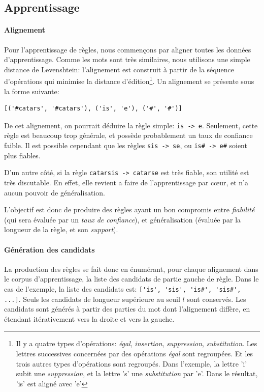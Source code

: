 \documentclass{article}
\begin{document}
\subsection{Apprentissage}
\paragraph{Alignement}
Pour l'apprentissage de règles, nous commençons par aligner toutes les données d'apprentissage. Comme les mots sont très similaires, nous utilisons une simple distance de Levenshtein: l'alignement est construit à partir de la séquence d'opérations qui minimise la distance d'édition\footnote{Il y a quatre types d'opérations: \emph{égal}, \emph{insertion}, \emph{suppression}, \emph{substitution}. Les lettres successives concernées par des opérations \emph{égal} sont regroupées. Et les trois autres types d'opérations sont regroupés. Dans l'exemple, la lettre 'i' subit une \emph{suppression}, et la lettre 's' une \emph{substitution} par 'e'. Dans le résultat, 'is' est aligné avec 'e'}.
Un alignement se présente sous la forme suivante:
\begin{verbatim}
[('#catars', '#catars'), ('is', 'e'), ('#', '#')]
\end{verbatim}

De cet alignement, on pourrait déduire la règle simple: \verb|is -> e|. Seulement, cette règle est beaucoup trop générale, et possède probablement un taux de confiance faible. Il est possible cependant que les règles \verb|sis -> se|, ou \verb|is# -> e#| soient plus fiables.

D'un autre côté, si la règle \verb|catarsis -> catarse| est très fiable, son utilité est très discutable. En effet, elle revient a faire de l'apprentissage par c\oe{}ur, et n'a aucun pouvoir de généralisation.

L'objectif est donc de produire des règles ayant un bon compromis entre \emph{fiabilité} (qui sera évaluée par un \emph{taux de confiance}), et généralisation (évaluée par la longueur de la règle, et son \emph{support}).

\paragraph{Génération des candidats}
La production des règles se fait donc en énumérant, pour chaque alignement dans le corpus d'apprentissage, la liste des candidats de partie gauche de règle. Dans le cas de l'exemple, la liste des candidats est: \verb|['is', 'sis', 'is#', 'sis#', ...]|. Seuls les candidats de longueur supérieure au seuil $l$ sont conservés. Les candidats sont générés à partir des parties du mot dont l'alignement diffère, en étendant itérativement vers la droite et vers la gauche.
\end{document}
